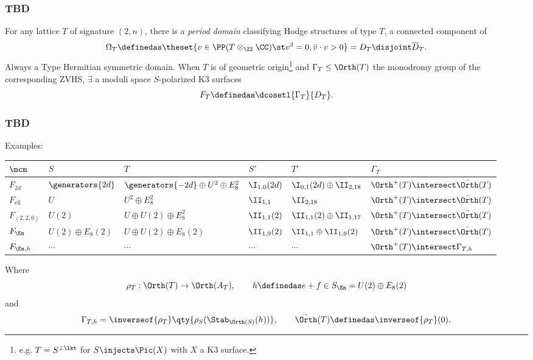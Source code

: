 \documentclass{beamer}
\begin{document}
{\begin{frame}
\end{frame}
\begin{frame}\frametitle{TBD}
For any lattice $T$ of signature $(2, n)$, there is a \textit{period domain} classifying Hodge structures of type $T$, a connected component of
\[
\Omega_T \definedas \theset{v\in \PP(T \otimes_\ZZ \CC) \st v^2 = 0, \bar{v}\cdot v > 0} = D_T \disjoint \overline{D}_T
.\]
Always a Type \IV Hermitian symmetric domain.
When $T$ is of geometric origin\footnote{e.g. $T = S^{\perp \lkt}$ for $S \injects \Pic(X)$ with $X$ a K3 surface.} and $\Gamma_T \leq \Orth(T)$ the monodromy group of the corresponding \textrm{ZVHS}, $\exists$ a moduli space $S$-polarized K3 surfaces
\[
F_T \definedas \dcosetl{\Gamma_T}{D_T}
.\]
\end{frame}
\begin{frame}\frametitle{TBD}
Examples:
{\tiny \begin{center}
\begin{tabular}{l|ll|ll|l}
	$\mcm$ & $S$ & $T$ & $S'$ & $T'$ & $\Gamma_T$ \\ \hline
	$F_{2d}$\cite{Sca87, Laz16, AET23}
		& $\generators{2d}$
		& $\generators{-2d} \oplus U^2 \oplus E_8^2$
		& $\I_{1,0}(2d)$
		& $\I_{0,1}(2d) \oplus \II_{2,18}$ 
		& $\Orth^+(T) \intersect \tilde{\Orth}(T)$ \\

	$F_{\mathrm{ell}}$\cite{ABE22}
		& $U$
		& $U^2 \oplus E_8^2$
		& $\II_{1,1}$
		& $\II_{2,18}$ 
		& $\Orth^+(T) \intersect \tilde{\Orth}(T)$ \\

	$F_{(2,2,0)}$\cite{AE22}
		& $U(2)$
		& $U \oplus U(2) \oplus E_8^2$
		& $\II_{1,1}(2)$
		& $\II_{1,1}(2) \oplus \II_{1,17}$ 
		& $\Orth^+(T) \intersect \tilde{\Orth}(T)$ \\

	$F_{\En}$\cite{Ste95a}
		& $U(2) \oplus E_8(2)$
		& $U \oplus U(2) \oplus E_8(2)$
		& $\II_{1,9}(2)$
		& $\II_{1,1} \oplus \II_{1,9}(2)$ 
		& $\Orth^+(T) \intersect \tilde{\Orth}(T)$ \\
		
	$F_{\En, h}$\cite{Ste95a}
		& $\cdots$
		& $\cdots$
		& $\cdots$
		& $\cdots$
		& $\Orth^+(T) \intersect \Gamma_{T, h}$ \\
\end{tabular}
\end{center}
}

Where
\[
\rho_T: \Orth(T) \to \Orth(A_T), \qquad h \definedas e + f \in S_{\En} = U(2) \oplus E_8(2)
\]
and
\[
\Gamma_{T, h} = \inverseof{\rho_T}\qty{ \rho_S(\Stab_{\Orth(S)}(h) ) },
\qquad
\tilde{\Orth}(T) \definedas  \inverseof{\rho_T}(0)
.\]


\end{frame}}
\end{document}
